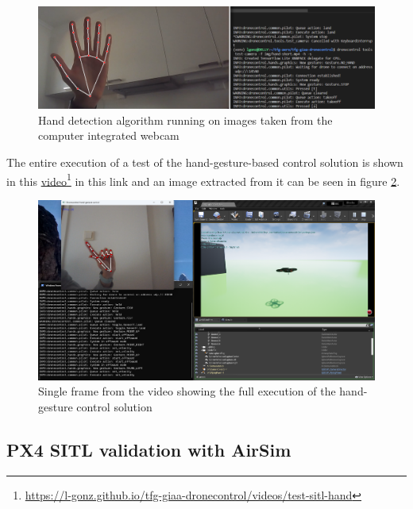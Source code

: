 \begin{figure}
  \centering
  \includegraphics[width=\textwidth, keepaspectratio]{img/sitl-hand-2.png}
  \caption{Hand detection algorithm running on images taken from the computer integrated webcam}\label{fig:sitl-hand}
\end{figure}

The entire execution of a test of the hand-gesture-based control solution is shown in this \href{https://l-gonz.github.io/tfg-giaa-dronecontrol/videos/test-sitl-hand}{video}\footnote{\url{https://l-gonz.github.io/tfg-giaa-dronecontrol/videos/test-sitl-hand}} in this link and an image extracted from it can be seen in figure \ref{fig:sitl-hand-video}.

\begin{figure}
  \centering
  \includegraphics[width=\textwidth, keepaspectratio]{img/video-hand-sitl.png}
  \caption{Single frame from the video showing the full execution of the hand-gesture control solution}
  \label{fig:sitl-hand-video}
\end{figure}


\subsection{PX4 SITL validation with AirSim}
\label{sec:test-3-airsim}

